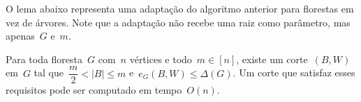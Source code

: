 


\bigskip
\bigskip
\bigskip



O lema abaixo representa uma adaptação do algoritmo anterior
para florestas em vez de árvores.
Note que a adaptação não recebe uma raiz como parâmetro, mas 
apenas~$G$ e~$m$.

\begin{lem}
\label{lema:simpleApproxCutForest}
	Para toda floresta~$G$ com~$n$ vértices e todo~${m \in [n]}$,
	existe um corte~$(B,W)$ em~$G$ tal 
	que~${\dfrac{m}{2} <|B| \le m}$ e~${e_G(B,W) \le \Delta(G)}$.
	Um corte que satisfaz esses requisitos pode ser computado em
	tempo~$O(n)$.
\end{lem}

